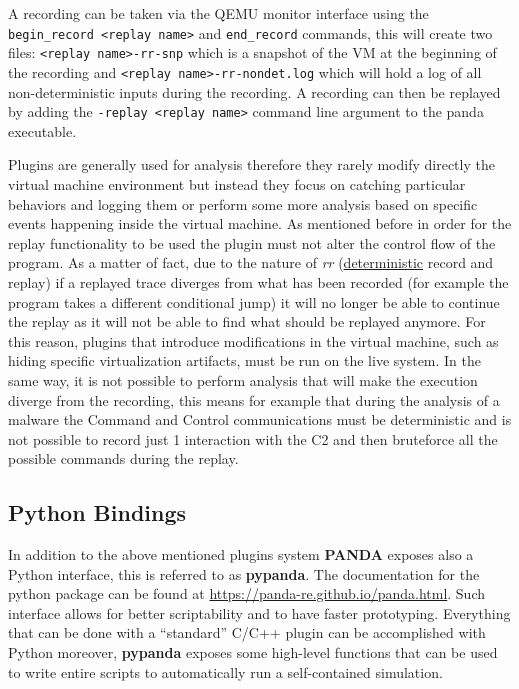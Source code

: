 A recording can be taken via the QEMU monitor interface using the \lstinline{begin_record <replay name>} and \lstinline{end_record} commands, this will create two files: \lstinline{<replay name>-rr-snp} which is a snapshot of the VM at the beginning of the recording and \lstinline{<replay name>-rr-nondet.log} which will hold a log of all non-deterministic inputs during the recording. A recording can then be replayed by adding the \lstinline{-replay <replay name>} command line argument to the panda executable. 

Plugins are generally used for analysis therefore they rarely modify directly the virtual machine environment but instead they focus on catching particular behaviors and logging them or perform some more analysis based on specific events happening inside the virtual machine. As mentioned before in order for the replay functionality to be used the plugin must not alter the control flow of the program. As a matter of fact, due to the nature of \textit{rr} (\underline{deterministic} record and replay) if a replayed trace diverges from what has been recorded (for example the program takes a different conditional jump) it will no longer be able to continue the replay as it will not be able to find what should be replayed anymore. For this reason, plugins that introduce modifications in the virtual machine, such as hiding specific virtualization artifacts, must be run on the live system. In the same way, it is not possible to perform analysis that will make the execution diverge from the recording, this means for example that during the analysis of a malware the Command and Control communications must be deterministic and is not possible to record just 1 interaction with the C2 and then bruteforce all the possible commands during the replay.


\subsection{Python Bindings}

In addition to the above mentioned plugins system \textbf{PANDA} exposes also a Python interface, this is referred to as \textbf{pypanda}. The documentation for the python package can be found at \url{https://panda-re.github.io/panda.html}. Such interface allows for better scriptability and to have faster prototyping. Everything that can be done with a ``standard'' C/C++ plugin can be accomplished with Python moreover, \textbf{pypanda} exposes some high-level functions that can be used to write entire scripts to automatically run a self-contained simulation.


